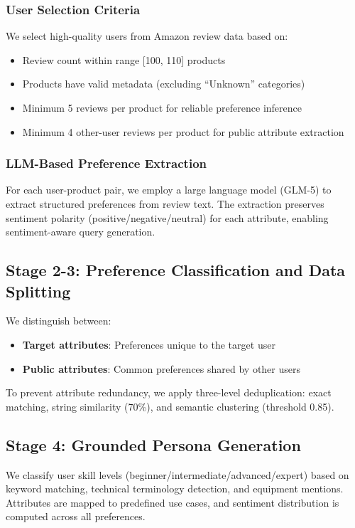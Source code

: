 \documentclass[11pt]{article}
\begin{document}
\subsubsection{User Selection Criteria}

We select high-quality users from Amazon review data based on:
\begin{itemize}
    \item Review count within range [100, 110] products
    \item Products have valid metadata (excluding ``Unknown'' categories)
    \item Minimum 5 reviews per product for reliable preference inference
    \item Minimum 4 other-user reviews per product for public attribute extraction
\end{itemize}

\subsubsection{LLM-Based Preference Extraction}

For each user-product pair, we employ a large language model (GLM-5) to extract structured preferences from review text. The extraction preserves sentiment polarity (positive/negative/neutral) for each attribute, enabling sentiment-aware query generation.

\subsection{Stage 2-3: Preference Classification and Data Splitting}

We distinguish between:
\begin{itemize}
    \item \textbf{Target attributes}: Preferences unique to the target user
    \item \textbf{Public attributes}: Common preferences shared by other users
\end{itemize}

To prevent attribute redundancy, we apply three-level deduplication: exact matching, string similarity (70\%), and semantic clustering (threshold 0.85).

\subsection{Stage 4: Grounded Persona Generation}

We classify user skill levels (beginner/intermediate/advanced/expert) based on keyword matching, technical terminology detection, and equipment mentions. Attributes are mapped to predefined use cases, and sentiment distribution is computed across all preferences.
\end{document}
